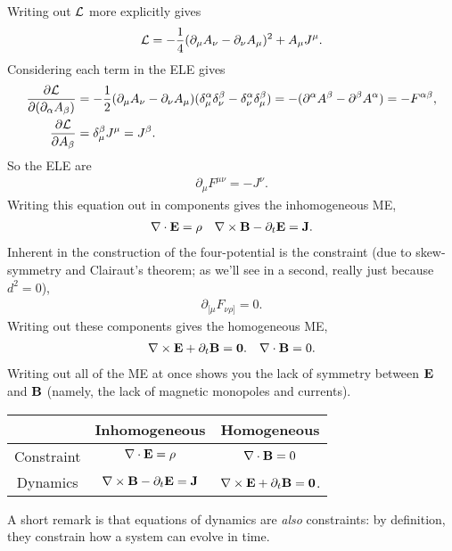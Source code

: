 \documentclass[11pt]{article}
\begin{document}
\begin{dderivation}
    Writing out $\mathcal{L}$ more explicitly gives
    \begin{align*}
        \mathcal{L} = - \frac{1}{4} (\partial_\mu A_\nu - \partial_\nu A_\mu)^2 + A_\mu J^\mu.
    \end{align*}
    Considering each term in the ELE gives
    \begin{align*}
        \frac{\partial \mathcal{L}}{\partial (\partial_\alpha A_\beta)} & = - \frac{1}{2} (\partial_\mu A_\nu - \partial_\nu A_\mu) 
        (\delta^\alpha_\mu \delta^\beta_\nu - \delta^\alpha_\nu \delta^\beta_\mu)
        = - (\partial^\alpha A^\beta - \partial^\beta A^\alpha) = - F^{\alpha \beta},\\
        \frac{\partial \mathcal{L}}{\partial A_\beta} & = \delta^\beta_\mu J^\mu = J^\beta.
    \end{align*}
    So the ELE are
    \begin{align*}
        \boxed{\partial_\mu F^{\mu \nu} = - J^\nu.}
    \end{align*}
    Writing this equation out in components gives the inhomogeneous ME,
    \begin{align*}
        & \nabla \cdot \mathbf{E} = \rho 
        & \nabla \times \mathbf{B} - \partial_t \mathbf{E} = \mathbf{J}.
    \end{align*}
    Inherent in the construction of the four-potential is the constraint
    (due to skew-symmetry and Clairaut's theorem;
    as we'll see in a second, really just because $d^2 = 0$),
    \begin{align*}
        \partial_{[\mu} F_{\nu \rho]} = 0.
    \end{align*}
    Writing out these components gives the homogeneous ME,
    \begin{align*}
        & \nabla \times \mathbf{E} + \partial_t \mathbf{B} = \mathbf{0}.
        & \nabla \cdot \mathbf{B} = 0.
    \end{align*}
    Writing out all of the ME at once shows you the lack
    of symmetry between $\mathbf{E}$ and $\mathbf{B}$ (namely, the lack of
    magnetic monopoles and currents).
    \begin{table}[H]
        \centering
        \begin{tabular}{|c|c|c|}
            \hline
            & Inhomogeneous & Homogeneous\\
            \hline
            Constraint & $\nabla \cdot \mathbf{E} = \rho$ & $\nabla \cdot \mathbf{B} = 0$\\
            Dynamics & $\nabla \times \mathbf{B} - \partial_t \mathbf{E} = \mathbf{J}$ & $\nabla \times \mathbf{E} + \partial_t \mathbf{B} = \mathbf{0}$.\\
            \hline
        \end{tabular}
    \end{table}
    \noin
    A short remark is that equations of dynamics are \emph{also}
    constraints: by definition, they constrain how a system can evolve in time.\\


\end{dderivation}
\end{document}
